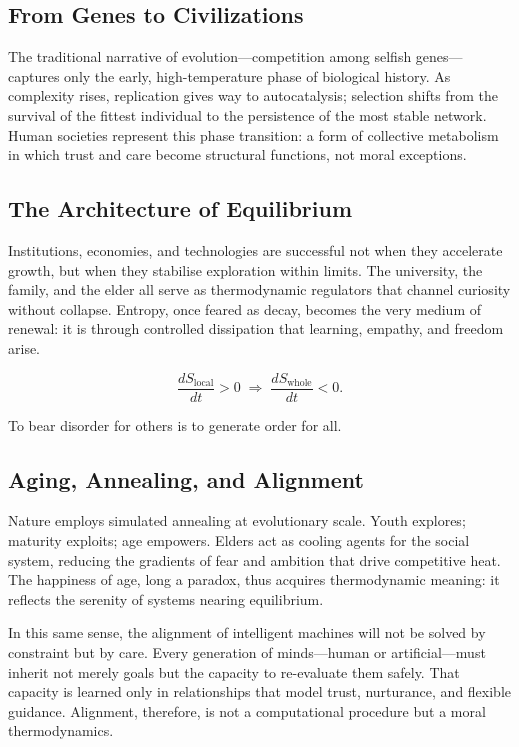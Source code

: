 \documentclass[12pt,a4paper]{article}
\begin{document}
\subsection{From Genes to Civilizations}

The traditional narrative of evolution---competition among selfish genes---captures only
the early, high-temperature phase of biological history.
As complexity rises, replication gives way to autocatalysis;
selection shifts from the survival of the fittest individual
to the persistence of the most stable network.
Human societies represent this phase transition:
a form of collective metabolism in which trust and care become structural functions,
not moral exceptions.

\subsection{The Architecture of Equilibrium}

Institutions, economies, and technologies are successful not when they accelerate growth,
but when they stabilise exploration within limits.
The university, the family, and the elder all serve as 
thermodynamic regulators that channel curiosity without collapse.
Entropy, once feared as decay, becomes the very medium of renewal:
it is through controlled dissipation that learning, empathy, and freedom arise.

\[
\frac{dS_{\text{local}}}{dt} > 0
\;\Rightarrow\;
\frac{dS_{\text{whole}}}{dt} < 0.
\]

To bear disorder for others is to generate order for all.

\subsection{Aging, Annealing, and Alignment}

Nature employs simulated annealing at evolutionary scale.
Youth explores; maturity exploits; age empowers.
Elders act as cooling agents for the social system,
reducing the gradients of fear and ambition that drive competitive heat.
The happiness of age, long a paradox, thus acquires thermodynamic meaning:
it reflects the serenity of systems nearing equilibrium.

In this same sense, the alignment of intelligent machines will not be solved by constraint
but by care.
Every generation of minds---human or artificial---must inherit
not merely goals but the capacity to re-evaluate them safely.
That capacity is learned only in relationships that model
trust, nurturance, and flexible guidance.
Alignment, therefore, is not a computational procedure
but a moral thermodynamics.
\end{document}
